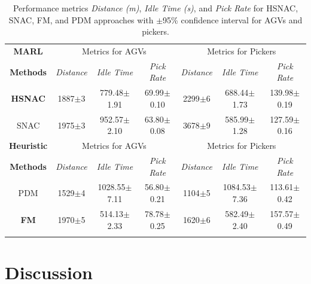 \documentclass{article}
\begin{document}
\begin{table}[t]
\centering
\caption{Performance metrics \textit{Distance (m)}, \textit{Idle Time (s)}, and \textit{Pick Rate} for HSNAC, SNAC, FM, and PDM approaches with $\pm$95\% confidence interval for AGVs and pickers.}
     \label{table_scale_results}
    \begin{center}
        \begin{tabular}{ccccccc}
        \toprule
         \textbf{MARL}&\multicolumn{3}{c}{Metrics for AGVs}&\multicolumn{3}{c}{Metrics for Pickers}\\
         \textbf{Methods}&\textit{Distance}&\textit{Idle Time}&\textit{Pick Rate}&\textit{Distance}&\textit{Idle Time}&\textit{Pick Rate}\\
        \midrule 
        \textbf{HSNAC}&1887$\pm$3&779.48$\pm$1.91&69.99$\pm$0.10&2299$\pm$6&688.44$\pm$1.73&139.98$\pm$0.19\\
        {SNAC}&1975$\pm$3&952.57$\pm$2.10&63.80$\pm$0.08&3678$\pm$9&585.99$\pm$1.28&127.59$\pm$0.16\\
        \midrule 
        \midrule 
        \textbf{Heuristic}&\multicolumn{3}{c}{Metrics for AGVs}&\multicolumn{3}{c}{Metrics for Pickers}\\
         \textbf{Methods}&\textit{Distance}&\textit{Idle Time}&\textit{Pick Rate}&\textit{Distance}&\textit{Idle Time}&\textit{Pick Rate}\\
         \midrule 
        {PDM}&1529$\pm$4&1028.55$\pm$7.11&56.80$\pm$0.21&1104$\pm$5&1084.53$\pm$7.36&113.61$\pm$0.42\\
        \textbf{FM}&1970$\pm$5&514.13$\pm$2.33&78.78$\pm$0.25&1620$\pm$6&582.49$\pm$2.40&157.57$\pm$0.49\\
        \bottomrule
        \\
       \end{tabular}
     \end{center}
\end{table}


\section{Discussion}
\end{document}
